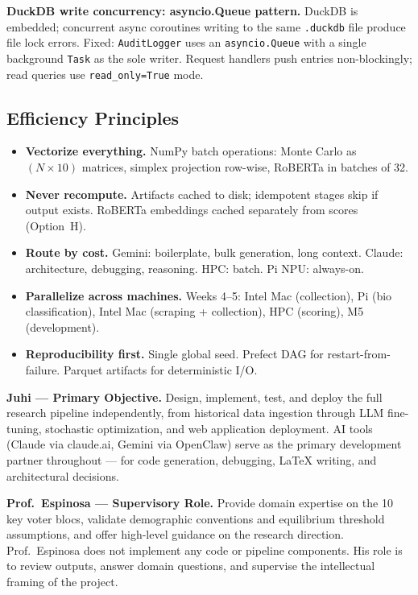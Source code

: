 \documentclass[11pt]{article}
\begin{document}
\textbf{DuckDB write concurrency: asyncio.Queue pattern.} DuckDB is embedded;
concurrent async coroutines writing to the same \texttt{.duckdb} file produce file
lock errors. Fixed: \texttt{AuditLogger} uses an \texttt{asyncio.Queue} with a
single background \texttt{Task} as the sole writer. Request handlers push entries
non-blockingly; read queries use \texttt{read\_only=True} mode.

\subsection*{Efficiency Principles}

\begin{itemize}[leftmargin=1.6em, itemsep=3pt]
  \item \textbf{Vectorize everything.} NumPy batch operations: Monte Carlo as
        $(N \times 10)$ matrices, simplex projection row-wise, RoBERTa in batches of 32.
  \item \textbf{Never recompute.} Artifacts cached to disk; idempotent stages skip
        if output exists. RoBERTa embeddings cached separately from scores (Option~H).
  \item \textbf{Route by cost.} Gemini: boilerplate, bulk generation, long context.
        Claude: architecture, debugging, reasoning. HPC: batch. Pi NPU: always-on.
  \item \textbf{Parallelize across machines.} Weeks 4--5: Intel Mac (collection),
        Pi (bio classification), Intel Mac (scraping + collection), HPC (scoring), M5 (development).
  \item \textbf{Reproducibility first.} Single global seed. Prefect DAG for
        restart-from-failure. Parquet artifacts for deterministic I/O.
\end{itemize}

\textbf{Juhi --- Primary Objective.}
Design, implement, test, and deploy the full research pipeline independently, from
historical data ingestion through LLM fine-tuning, stochastic optimization, and
web application deployment. AI tools (Claude via claude.ai, Gemini via OpenClaw)
serve as the primary development partner throughout --- for code generation,
debugging, LaTeX writing, and architectural decisions.

\textbf{Prof.\ Espinosa --- Supervisory Role.}
Provide domain expertise on the 10 key voter blocs, validate demographic
conventions and equilibrium threshold assumptions, and offer high-level guidance
on the research direction. Prof.\ Espinosa does not implement any code or pipeline
components. His role is to review outputs, answer domain questions, and supervise
the intellectual framing of the project.
\end{document}

